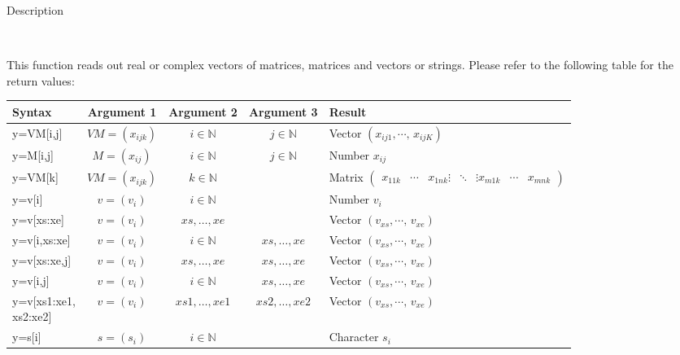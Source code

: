 \begin{description}
\item [Description]~
\end{description}
This function reads out real or complex vectors of matrices, matrices
and vectors or strings. Please refer to the following table for the
return values:

\begin{flushleft}\begin{tabular}{|p{3.2cm}|c|c|c||p{4cm}|}
\hline 
Syntax&
Argument 1&
Argument 2&
Argument 3&
Result\tabularnewline
\hline
\hline 
y=VM{[}i,j{]}&
$VM=\left(x_{ijk}\right)$&
$i\in\mathbb{N}$&
$j\in\mathbb{N}$&
\parbox[t]{4cm}{Vector\\
$\left(x_{ij1},\cdots,\, x_{ijK}\right)$}\tabularnewline
\hline 
y=M{[}i,j{]}&
$M=\left(x_{ij}\right)$&
$i\in\mathbb{N}$&
$j\in\mathbb{N}$&
Number $x_{ij}$\tabularnewline
\hline 
y=VM{[}k{]}&
$VM=\left(x_{ijk}\right)$&
$k\in\mathbb{N}$&
&
\parbox[t]{4cm}{Matrix \\
$\left(\begin{array}{ccc}
x_{11k} & \cdots & x_{1nk}\\
\vdots & \ddots & \vdots\\
x_{m1k} & \cdots & x_{mnk}\end{array}\right)$}\tabularnewline
\hline 
y=v{[}i{]}&
$v=\left(v_{i}\right)$&
$i\in\mathbb{N}$&
&
Number $v_{i}$\tabularnewline
\hline 
y=v{[}xs:xe{]}&
$v=\left(v_{i}\right)$&
$xs,\ldots,xe$&
&
\parbox[t]{4cm}{Vector \\
$\left(v_{xs},\cdots,\, v_{xe}\right)$}\tabularnewline
\hline 
y=v{[}i,xs:xe{]}&
$v=\left(v_{i}\right)$&
$i\in\mathbb{N}$&
$xs,\ldots,xe$&
\parbox[t]{4cm}{Vector \\
$\left(v_{xs},\cdots,\, v_{xe}\right)$}\tabularnewline
\hline 
y=v{[}xs:xe,j{]}&
$v=\left(v_{i}\right)$&
$xs,\ldots,xe$&
$xs,\ldots,xe$&
\parbox[t]{4cm}{Vector \\
$\left(v_{xs},\cdots,\, v_{xe}\right)$}\tabularnewline
\hline
y=v{[}i,j{]}&
$v=\left(v_{i}\right)$&
$i\in\mathbb{N}$&
$xs,\ldots,xe$&
\parbox[t]{4cm}{Vector \\
$\left(v_{xs},\cdots,\, v_{xe}\right)$}\tabularnewline
\hline
\parbox[t]{3.2cm}{y=v{[}xs1:xe1,\\
xs2:xe2{]}}&
$v=\left(v_{i}\right)$&
$xs1,\ldots,xe1$&
$xs2,\ldots,xe2$&
\parbox[t]{4cm}{Vector \\
$\left(v_{xs},\cdots,\, v_{xe}\right)$}\tabularnewline
\hline
y=s{[}i{]}&
$s=\left(s_{i}\right)$&
$i\in\mathbb{N}$&
&
Character $s_{i}$\tabularnewline
\hline
\end{tabular}\end{flushleft}

